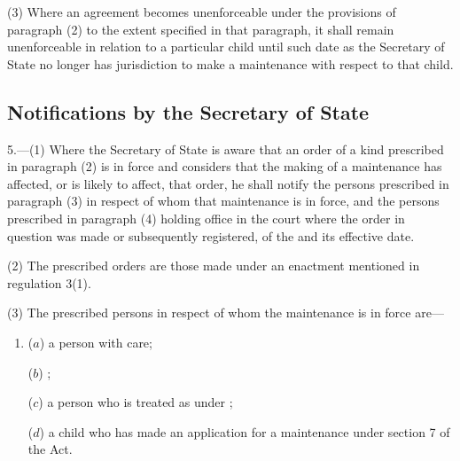 \documentclass[12pt,a4paper]{article}
\begin{document}
(3) Where an agreement becomes unenforceable under the provisions of paragraph (2) to the extent specified in that paragraph, it shall remain unenforceable in relation to a particular child until such date as 
the Secretary of State  %
no longer has jurisdiction to make a maintenance  with respect to that child.



\subsection[5. Notifications by the Secretary of State]{Notifications by the Secretary of State}

5.—(1) Where 
the Secretary of State  %
is aware that an order of a kind prescribed in paragraph (2) is in force and considers that the making of a maintenance  has affected, or is likely to affect, that order, he shall notify the persons prescribed in paragraph (3) in respect of whom that maintenance  is in force, and the persons prescribed in paragraph (4) holding office in the court where the order in question was made or subsequently registered, of the  and its effective date.

(2) The prescribed orders are those made under an enactment mentioned in regulation 3(1).

(3) The prescribed persons in respect of whom the maintenance  is in force are—
\begin{enumerate}\item[]
($a$) a person with care;

($b$) ;

($c$) a person who is treated as  under 
;  %

($d$) a child who has made an application for a maintenance  under section 7 of the Act.
\end{enumerate}
\end{document}
